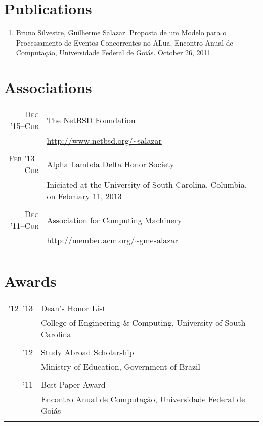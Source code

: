 \documentclass[a4paper,10pt]{article}
\begin{document}
\section{Publications}
\begin{enumerate}
  \renewcommand{\labelenumi}{[\arabic{enumi}] }
  \item Bruno Silvestre, Guilherme Salazar. Proposta de um Modelo para o
        Processamento de Eventos Concorrentes no ALua. Encontro Anual de
        Computação, Universidade Federal de Goiás. October 26, 2011 \\
\end{enumerate}

\section{Associations}

\begin{tabular}{r|p{11cm}}

  \textsc{Dec '15--Cur}
  & The NetBSD Foundation\\
  & \footnotesize{\url{http://www.netbsd.org/~salazar}}
  \\\multicolumn{2}{c}{}\\

  \textsc{Feb '13--Cur}
  & Alpha Lambda Delta Honor Society\\
  & \footnotesize{Iniciated at the University of South Carolina, Columbia, on February 11, 2013}\\
  \multicolumn{2}{c}{}\\

  \textsc{Dec '11--Cur}
  & Association for Computing Machinery\\
  & \footnotesize{\url{http://member.acm.org/~gmesalazar}}
  \\\multicolumn{2}{c}{}\\
  
\end{tabular}

\section{Awards}
\begin{tabular}{r|p{11cm}}

  \textsc{'12--'13}
  & Dean's Honor List\\
  & College of Engineering \& Computing, University of South Carolina\\
  \multicolumn{2}{c}{}\\

  \textsc{'12}
  & Study Abroad Scholarship\\
  & Ministry of Education, Government of Brazil\\
  \multicolumn{2}{c}{}\\

  \textsc{'11}
  & Best Paper Award\\
  & Encontro Anual de Computação, Universidade Federal de Goiás\\
  \multicolumn{2}{c}{}\\

\end{tabular}
\end{document}
